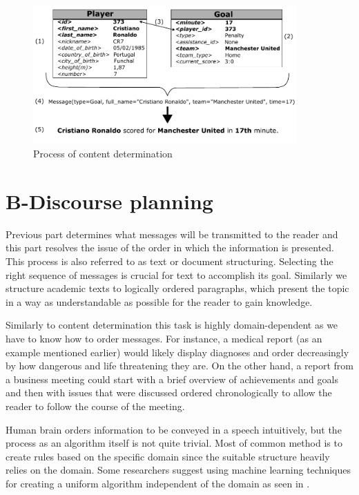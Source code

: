 \begin{figure}[h]
	\centerline{\includegraphics[width=0.9\textwidth]{../img/content_determination.pdf}}
	\caption{Process of content determination}
	\label{fig:cd}
\end{figure}

\section{B-Discourse planning}
Previous part determines what messages will be transmitted to the reader and this part resolves the issue of the order in which the information is presented. This process is also referred to as text or document structuring. Selecting the right sequence of messages is crucial for text to accomplish its goal. Similarly we structure academic texts to logically ordered paragraphs, which present the topic in a way as understandable as possible for the reader to gain knowledge.

Similarly to content determination this task is highly domain-dependent as we have to know how to order messages. For instance, a medical report (as an example mentioned earlier) would likely display diagnoses and order decreasingly by how dangerous and life threatening they are. On the other hand, a report from a business meeting could start with a brief overview of achievements and goals and then with issues that were discussed ordered chronologically to allow the reader to follow the course of the meeting.

Human brain orders information to be conveyed in a speech intuitively, but the process as an algorithm itself is not quite trivial. Most of common method is to create rules based on the specific domain since the suitable structure heavily relies on the domain. Some researchers suggest using machine learning techniques for creating a  uniform algorithm independent of the domain as seen in \cite{dimitromanolaki2003learning}.

